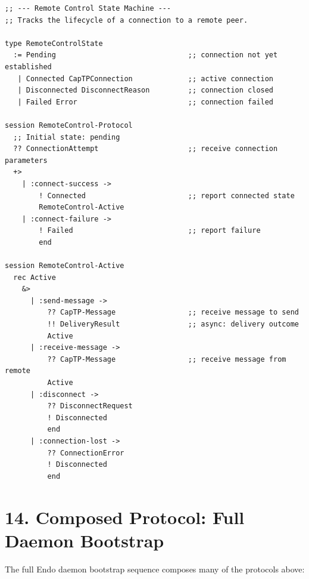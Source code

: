 \documentclass[11pt]{article}
\begin{document}
\begin{verbatim}
;; --- Remote Control State Machine ---
;; Tracks the lifecycle of a connection to a remote peer.

type RemoteControlState
  := Pending                               ;; connection not yet established
   | Connected CapTPConnection             ;; active connection
   | Disconnected DisconnectReason         ;; connection closed
   | Failed Error                          ;; connection failed

session RemoteControl-Protocol
  ;; Initial state: pending
  ?? ConnectionAttempt                     ;; receive connection parameters
  +>
    | :connect-success ->
        ! Connected                        ;; report connected state
        RemoteControl-Active
    | :connect-failure ->
        ! Failed                           ;; report failure
        end

session RemoteControl-Active
  rec Active
    &>
      | :send-message ->
          ?? CapTP-Message                 ;; receive message to send
          !! DeliveryResult                ;; async: delivery outcome
          Active
      | :receive-message ->
          ?? CapTP-Message                 ;; receive message from remote
          Active
      | :disconnect ->
          ?? DisconnectRequest
          ! Disconnected
          end
      | :connection-lost ->
          ?? ConnectionError
          ! Disconnected
          end
\end{verbatim}
\section{14. Composed Protocol: Full Daemon Bootstrap}
\label{sec:orgb8ccfc8}

The full Endo daemon bootstrap sequence composes many of the protocols above:
\end{document}
